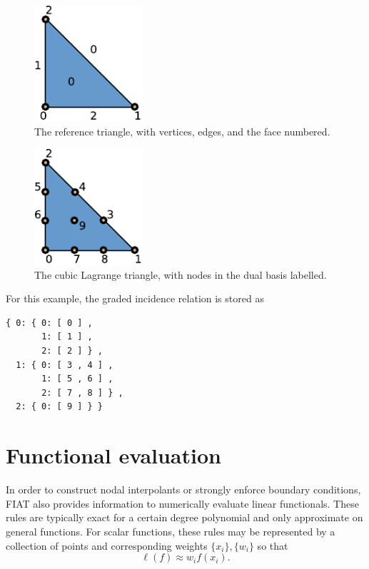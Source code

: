 \begin{figure}[h]
  \label{fig:reftri}
  \begin{center}
    \includegraphics[width=4cm]{chapters/kirby-2/pdf/reftri.pdf}
    \caption{The reference triangle, with vertices, edges, and the
      face numbered.}
  \end{center}
\end{figure}

\begin{figure}[h]
  \label{fig:p3}
  \begin{center}
    \includegraphics[width=4cm]{chapters/kirby-2/pdf/P3.pdf}
    \caption{The cubic Lagrange triangle, with nodes in the dual basis
      labelled.}
  \end{center}
\end{figure}

For this example, the graded incidence relation is stored as
\begin{verbatim}
{ 0: { 0: [ 0 ] ,
       1: [ 1 ] ,
       2: [ 2 ] } ,
  1: { 0: [ 3 , 4 ] ,
       1: [ 5 , 6 ] ,
       2: [ 7 , 8 ] } ,
  2: { 0: [ 9 ] } }
\end{verbatim}

\section{Functional evaluation}
In order to construct nodal interpolants or strongly enforce boundary
conditions, FIAT also provides information to numerically evaluate
linear functionals.  These rules are typically exact for a certain
degree polynomial and only approximate on general functions.  For
scalar functions, these rules may be represented by a collection of
points and corresponding weights \( \{ x_i \} , \{ w_i \} \) so that
\[
\ell( f ) \approx w_i f(x_i).
\]


